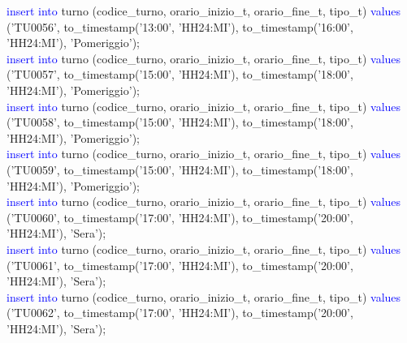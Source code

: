 \documentclass{article}
\begin{document}
\begin{flushleft}
{        \hspace*{0.5em}\textcolor{blue}{insert into} turno (codice\_turno, orario\_inizio\_t, orario\_fine\_t, tipo\_t) \textcolor{blue}{values} \hspace*{0.5em}('TU0056', to\_timestamp('13:00', 'HH24:MI'), to\_timestamp('16:00', 'HH24:MI'), \hspace*{0.5em}'Pomeriggio'); \\
        \hspace*{0.5em}\textcolor{blue}{insert into} turno (codice\_turno, orario\_inizio\_t, orario\_fine\_t, tipo\_t) \textcolor{blue}{values} \hspace*{0.5em}('TU0057', to\_timestamp('15:00', 'HH24:MI'), to\_timestamp('18:00', 'HH24:MI'), \hspace*{0.5em}'Pomeriggio'); \\
        \hspace*{0.5em}\textcolor{blue}{insert into} turno (codice\_turno, orario\_inizio\_t, orario\_fine\_t, tipo\_t) \textcolor{blue}{values} \hspace*{0.5em}('TU0058', to\_timestamp('15:00', 'HH24:MI'), to\_timestamp('18:00', 'HH24:MI'), \hspace*{0.5em}'Pomeriggio'); \\
        \hspace*{0.5em}\textcolor{blue}{insert into} turno (codice\_turno, orario\_inizio\_t, orario\_fine\_t, tipo\_t) \textcolor{blue}{values} \hspace*{0.5em}('TU0059', to\_timestamp('15:00', 'HH24:MI'), to\_timestamp('18:00', 'HH24:MI'), \hspace*{0.5em}'Pomeriggio'); \\
        \hspace*{0.5em}\textcolor{blue}{insert into} turno (codice\_turno, orario\_inizio\_t, orario\_fine\_t, tipo\_t) \textcolor{blue}{values} \hspace*{0.5em}('TU0060', to\_timestamp('17:00', 'HH24:MI'), to\_timestamp('20:00', 'HH24:MI'), \hspace*{0.5em}'Sera'); \\
        \hspace*{0.5em}\textcolor{blue}{insert into} turno (codice\_turno, orario\_inizio\_t, orario\_fine\_t, tipo\_t) \textcolor{blue}{values} \hspace*{0.5em}('TU0061', to\_timestamp('17:00', 'HH24:MI'), to\_timestamp('20:00', 'HH24:MI'), \hspace*{0.5em}'Sera'); \\
        \hspace*{0.5em}\textcolor{blue}{insert into} turno (codice\_turno, orario\_inizio\_t, orario\_fine\_t, tipo\_t) \textcolor{blue}{values} \hspace*{0.5em}('TU0062', to\_timestamp('17:00', 'HH24:MI'), to\_timestamp('20:00', 'HH24:MI'), \hspace*{0.5em}'Sera'); \\
}
\end{flushleft}
\end{document}

